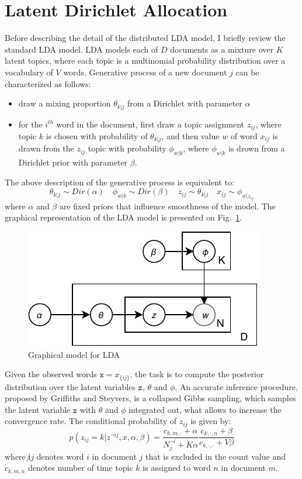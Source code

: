 \documentclass[journal]{IEEEtran}
\begin{document}
\section{Latent Dirichlet Allocation}
Before describing the detail of the distributed LDA model, I briefly review the standard LDA model. LDA models each of $D$ documents as a mixture over $K$ latent topics, where each topic is a multinomial probability distribution over a vocabulary of $V$ words. Generative process of a new document $j$ can be characterized as follows:
\begin{itemize}
\item draw a mixing proportion $\theta_{k|j}$ from a Dirichlet with parameter $\alpha$
\item for the $i^{th}$ word in the document, first draw a topic assignment $z_{ij}$, where topic $k$ is chosen with probability of $\theta_{k|j}$, and then value $w$ of word $x_{ij}$ is drawn from the $z_{ij}$ topic with probability $\phi_{w|k}$, where $\phi_{w|k}$ is drown from a Dirichlet prior with parameter $\beta$.
\end{itemize}
The above description of the generative process is equivalent to:
$$
\theta_{k|j}\sim Dir(\alpha) \quad \phi_{w|k}\sim Dir(\beta) \quad  z_{ij}\sim \theta_{k|j} \quad  x_{ij}\sim \phi_{w|z_{ij}}
$$
where $\alpha$ and $\beta$ are fixed priors that influence smoothness of the model. The graphical representation of the LDA model is presented on Fig.~\ref{fig:lda}.
\begin{figure}
\centering
\includegraphics[scale=0.9]{plots/LDA.pdf}
\caption{Graphical model for LDA}
\label{fig:lda}
\end{figure}

Given the observed words $\texttt{x}=x_{\{ij\}}$, the task is to compute the posterior distribution over the latent variables $\texttt{z}$, $\theta$ and $\phi$. An accurate inference procedure, proposed by Griffiths and Steyvers\cite{griffiths2004finding}, is a collapsed Gibbs sampling, which samples the latent variable $\texttt{z}$ with $\theta$ and $\phi$ integrated out, what allows to increase the convergence rate. The conditional probability of $z_{ij}$ is given by:
$$
p(z_{ij}=k|z^{\lnot ij}, x, \alpha, \beta) = \dfrac{c_{k,m,\cdot} + \alpha}{N_{j}^{\lnot i}+K\alpha} \frac{c_{k,\cdot,n} + \beta}{c_{k,\cdot,\cdot} + V\beta}
$$ 
where $\not ij$ denotes word $i$ in document $j$ that is excluded in the count value and $c_{k,m,n}$ denotes number of time topic $k$ is assigned to word $n$ in document $m$.
\end{document}
